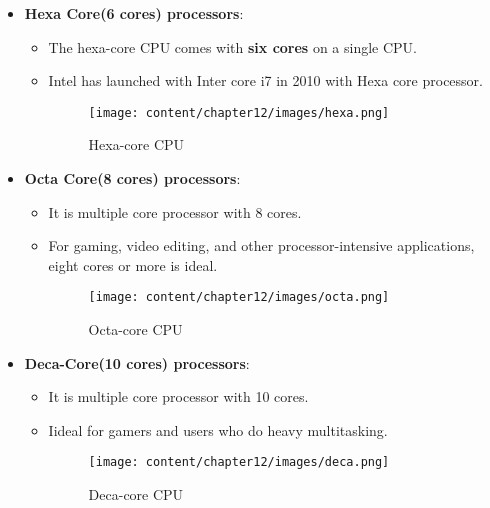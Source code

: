 \begin{flushleft}
\begin{itemize}
	\item \textbf{Hexa Core(6 cores) processors}:
	\begin{itemize}
		\item The hexa-core CPU comes with \textbf{six cores} on a single CPU. 
		\item Intel has launched with Inter core i7 in 2010 with Hexa core processor.
		\begin{figure}[h!]
			\centering
			\texttt{[image: content/chapter12/images/hexa.png]}
			\caption{Hexa-core CPU}
			\label{fig:single-core4}
		\end{figure}
	\end{itemize}			
	\newpage
	\item \textbf{Octa Core(8 cores) processors}:
	\begin{itemize}
		\item It is multiple core processor with 8 cores.
		\item For gaming, video editing, and other processor-intensive applications, eight cores or more is ideal.
		\begin{figure}[h!]
			\centering
			\texttt{[image: content/chapter12/images/octa.png]}
			\caption{Octa-core CPU}
			\label{fig:single-core4}
		\end{figure}
	\end{itemize}		
	
	\bigskip
	
	\item \textbf{Deca-Core(10 cores) processors}:
	\begin{itemize}
		\item It is multiple core processor with 10 cores.
		\item Iideal for gamers and users who do heavy multitasking.
		\begin{figure}[h!]
			\centering
			\texttt{[image: content/chapter12/images/deca.png]}
			\caption{Deca-core CPU}
			\label{fig:single-core4}
		\end{figure}
	\end{itemize}		
	
	
\end{itemize}



\end{flushleft}

\newpage


